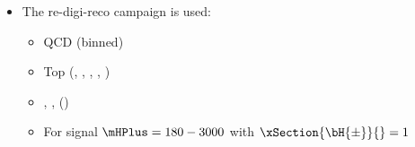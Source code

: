 \vspace{0.2cm}
\begin{itemize}%
\item The \MoriondTwentySeventeen re-digi-reco campaign is used:
  \begin{itemize}%
  \item QCD (\HT binned)
  \item Top (\SingleTop, \TT, \TTZ, \TTW, \TTTT)
  \item \WJets, \DYJets, \Diboson (\DibosonExplicit)
  \item For signal $\mHPlus = 180 - 3000$  with $\xSection{\bH{\pm}}{} = 1$ \sPb
  \end{itemize}%
\end{itemize}%
